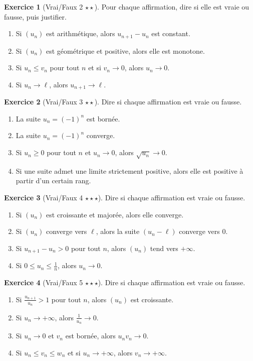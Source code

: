 \documentclass[11pt,a4paper]{article}
\theoremstyle{definition}
\newtheorem{exercice}{Exercice}[section]
\newcommand{\etoile}[1]{\hfill{\small\textbf{#1}}}
\begin{document}
\begin{exercice}[Vrai/Faux 2 \etoile{$\star\star$}]
Pour chaque affirmation, dire si elle est vraie ou fausse, puis justifier.
\begin{enumerate}[label=\alph*)]
    \item Si $(u_n)$ est arithmétique, alors $u_{n+1}-u_n$ est constant.
    \item Si $(u_n)$ est géométrique et positive, alors elle est monotone.
    \item Si $u_n \le v_n$ pour tout $n$ et si $v_n\to 0$, alors $u_n\to 0$.
    \item Si $u_n\to \ell$, alors $u_{n+1}\to \ell$.
\end{enumerate}
\end{exercice}

\begin{exercice}[Vrai/Faux 3 \etoile{$\star\star$}]
Dire si chaque affirmation est vraie ou fausse.
\begin{enumerate}[label=\alph*)]
    \item La suite $u_n=(-1)^n$ est bornée.
    \item La suite $u_n=(-1)^n$ converge.
    \item Si $u_n\ge 0$ pour tout $n$ et $u_n\to 0$, alors $\sqrt{u_n}\to 0$.
    \item Si une suite admet une limite strictement positive, alors elle est positive à partir d'un certain rang.
\end{enumerate}
\end{exercice}

\begin{exercice}[Vrai/Faux 4 \etoile{$\star\star\star$}]
Dire si chaque affirmation est vraie ou fausse.
\begin{enumerate}[label=\alph*)]
    \item Si $(u_n)$ est croissante et majorée, alors elle converge.
    \item Si $(u_n)$ converge vers $\ell$, alors la suite $(u_n-\ell)$ converge vers $0$.
    \item Si $u_{n+1}-u_n>0$ pour tout $n$, alors $(u_n)$ tend vers $+\infty$.
    \item Si $0\le u_n\le \frac1n$, alors $u_n\to 0$.
\end{enumerate}
\end{exercice}

\begin{exercice}[Vrai/Faux 5 \etoile{$\star\star\star$}]
Dire si chaque affirmation est vraie ou fausse.
\begin{enumerate}[label=\alph*)]
    \item Si $\frac{u_{n+1}}{u_n}>1$ pour tout $n$, alors $(u_n)$ est croissante.
    \item Si $u_n\to+\infty$, alors $\frac1{u_n}\to 0$.
    \item Si $u_n\to 0$ et $v_n$ est bornée, alors $u_nv_n\to0$.
    \item Si $u_n\le v_n\le w_n$ et si $u_n\to+\infty$, alors $v_n\to+\infty$.
\end{enumerate}
\end{exercice}
\end{document}

